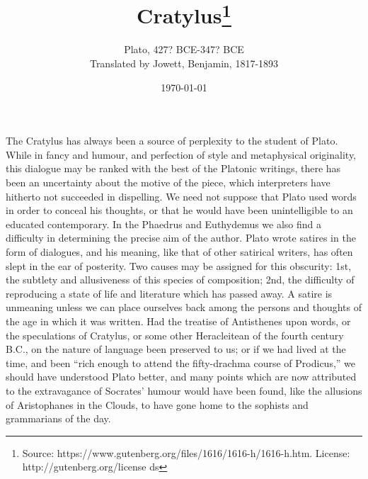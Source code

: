 \documentclass[11pt,letter]{article}
\begin{document}
\title{Cratylus\thanks{Source: https://www.gutenberg.org/files/1616/1616-h/1616-h.htm. License: http://gutenberg.org/license ds}}
\date{\today}
\author{Plato, 427? BCE-347? BCE\\ Translated by Jowett, Benjamin, 1817-1893}
\maketitle

\setcounter{tocdepth}{1}
\tableofcontents
\renewcommand{\baselinestretch}{1.0}
\normalsize
\newpage


\par  The Cratylus has always been a source of perplexity to the student of Plato. While in fancy and humour, and perfection of style and metaphysical originality, this dialogue may be ranked with the best of the Platonic writings, there has been an uncertainty about the motive of the piece, which interpreters have hitherto not succeeded in dispelling. We need not suppose that Plato used words in order to conceal his thoughts, or that he would have been unintelligible to an educated contemporary. In the Phaedrus and Euthydemus we also find a difficulty in determining the precise aim of the author. Plato wrote satires in the form of dialogues, and his meaning, like that of other satirical writers, has often slept in the ear of posterity. Two causes may be assigned for this obscurity: 1st, the subtlety and allusiveness of this species of composition; 2nd, the difficulty of reproducing a state of life and literature which has passed away. A satire is unmeaning unless we can place ourselves back among the persons and thoughts of the age in which it was written. Had the treatise of Antisthenes upon words, or the speculations of Cratylus, or some other Heracleitean of the fourth century B.C., on the nature of language been preserved to us; or if we had lived at the time, and been “rich enough to attend the fifty-drachma course of Prodicus,” we should have understood Plato better, and many points which are now attributed to the extravagance of Socrates’ humour would have been found, like the allusions of Aristophanes in the Clouds, to have gone home to the sophists and grammarians of the day.
\end{document}
